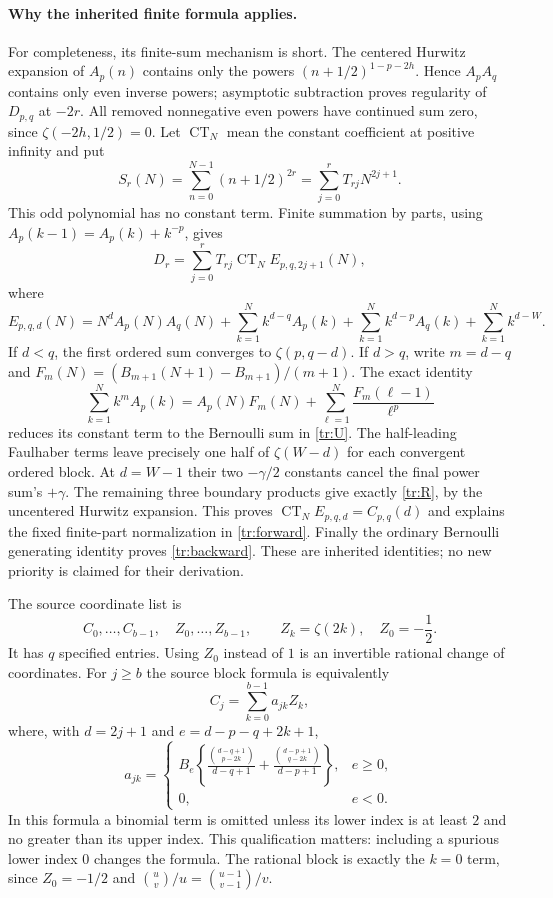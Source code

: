 \documentclass[11pt,a4paper]{article}
\numberwithin{equation}{section}
\theoremstyle{definition}
\begin{document}
\paragraph{Why the inherited finite formula applies.}
For completeness, its finite-sum mechanism is short. The centered
Hurwitz expansion of $A_p(n)$ contains only the powers
$(n+1/2)^{1-p-2h}$. Hence $A_pA_q$ contains only even inverse powers;
asymptotic subtraction proves regularity of $D_{p,q}$ at $-2r$.
All removed nonnegative even powers have continued sum zero, since
$\zeta(-2h,1/2)=0$. Let $\operatorname{CT}_N$ mean the constant
coefficient at positive infinity and put
\[
 S_r(N)=\sum_{n=0}^{N-1}(n+1/2)^{2r}
       =\sum_{j=0}^r T_{rj}N^{2j+1}.
\]
This odd polynomial has no constant term. Finite summation by parts,
using $A_p(k-1)=A_p(k)+k^{-p}$, gives
\[
 D_r=\sum_{j=0}^rT_{rj}\operatorname{CT}_N E_{p,q,2j+1}(N),
\]
where
\[
 E_{p,q,d}(N)=N^dA_p(N)A_q(N)
 +\sum_{k=1}^N k^{d-q}A_p(k)
 +\sum_{k=1}^N k^{d-p}A_q(k)
 +\sum_{k=1}^N k^{d-W}.
\]
If $d<q$, the first ordered sum converges to $\zeta(p,q-d)$.
If $d>q$, write $m=d-q$ and
$F_m(N)=(B_{m+1}(N+1)-B_{m+1})/(m+1)$. The exact identity
\[
 \sum_{k=1}^Nk^mA_p(k)
 =A_p(N)F_m(N)+\sum_{\ell=1}^N\frac{F_m(\ell-1)}{\ell^p}
\]
reduces its constant term to the Bernoulli sum in \eqref{tr:U}.
The half-leading Faulhaber terms leave precisely one half of
$\zeta(W-d)$ for each convergent ordered block. At $d=W-1$ their
two $-\gamma/2$ constants cancel the final power sum's $+\gamma$.
The remaining three boundary products give exactly \eqref{tr:R},
by the uncentered Hurwitz expansion. This proves
$\operatorname{CT}_NE_{p,q,d}=C_{p,q}(d)$ and explains the fixed
finite-part normalization in \eqref{tr:forward}. Finally the ordinary
Bernoulli generating identity proves \eqref{tr:backward}. These are
inherited identities; no new priority is claimed for their derivation.

The source coordinate list is
\begin{equation}\label{tr:coordinates}
 C_0,\ldots,C_{b-1},\quad Z_0,\ldots,Z_{b-1},
 \qquad Z_k=\zeta(2k),\quad Z_0=-\frac12.
\end{equation}
It has $q$ specified entries. Using $Z_0$ instead of $1$ is an invertible
rational change of coordinates. For $j\ge b$ the source block formula
is equivalently
\begin{equation}\label{tr:A}
 C_j=\sum_{k=0}^{b-1}a_{jk}Z_k,
\end{equation}
where, with $d=2j+1$ and $e=d-p-q+2k+1$,
\begin{equation}\label{tr:Aentries}
 a_{jk}=
 \begin{cases}
 B_e\left\{
 \displaystyle\frac{\binom{d-q+1}{p-2k}}{d-q+1}
 +\displaystyle\frac{\binom{d-p+1}{q-2k}}{d-p+1}
 \right\},& e\ge0,\\[5pt]
 0,&e<0.
 \end{cases}
\end{equation}
In this formula a binomial term is omitted unless its lower index is at
least $2$ and no greater than its upper index. This qualification matters:
including a spurious lower index $0$ changes the formula. The rational
block is exactly the $k=0$ term, since $Z_0=-1/2$ and
$\binom{u}{v}/u=\binom{u-1}{v-1}/v$.
\end{document}
